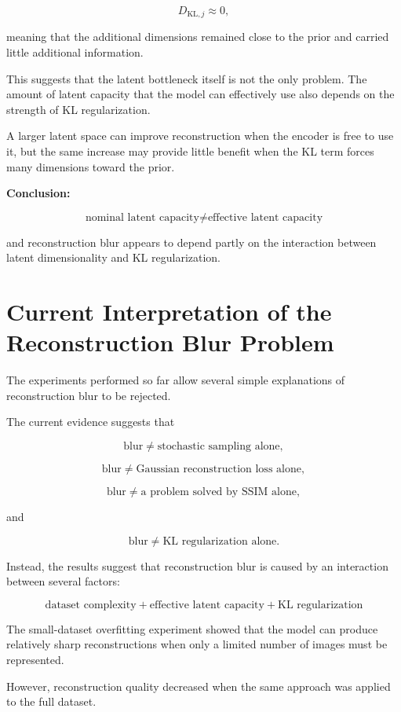 \documentclass[a4paper,11pt]{article}
\begin{document}
\[
D_{\mathrm{KL},j} \approx 0,
\]

meaning that the additional dimensions remained close to the prior and carried little additional information.

This suggests that the latent bottleneck itself is not the only problem. The amount of latent capacity that the model can effectively use also depends on the strength of KL regularization.

A larger latent space can improve reconstruction when the encoder is free to use it, but the same increase may provide little benefit when the KL term forces many dimensions toward the prior.

\textbf{Conclusion:}

\[
\boxed{
\text{nominal latent capacity}
\neq
\text{effective latent capacity}
}
\]

and reconstruction blur appears to depend partly on the interaction between latent dimensionality and KL regularization.


\section{Current Interpretation of the Reconstruction Blur Problem}

The experiments performed so far allow several simple explanations of reconstruction blur to be rejected.

The current evidence suggests that

\[
\text{blur}
\neq
\text{stochastic sampling alone},
\]

\[
\text{blur}
\neq
\text{Gaussian reconstruction loss alone},
\]

\[
\text{blur}
\neq
\text{a problem solved by SSIM alone},
\]

and

\[
\text{blur}
\neq
\text{KL regularization alone}.
\]

Instead, the results suggest that reconstruction blur is caused by an interaction between several factors:

\[
\boxed{
\text{dataset complexity}
+
\text{effective latent capacity}
+
\text{KL regularization}
}
\]

The small-dataset overfitting experiment showed that the model can produce relatively sharp reconstructions when only a limited number of images must be represented.

However, reconstruction quality decreased when the same approach was applied to the full dataset.
\end{document}

